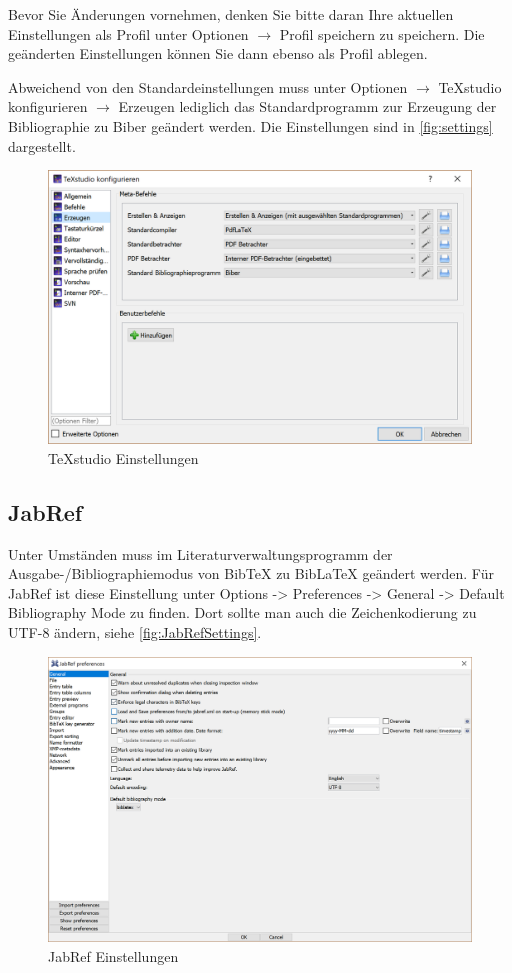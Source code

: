 \documentclass[final, english, ngerman, a4paper, 10pt, %
numbers=noenddot,
cd=true,
cdfont=false,cdfont=nohead,cdfont=nodin,
cdmath=false,
cdhead=false,
cdfoot=true,
cdcover=monochrome,
cdgeometry=symmetric,
declaration=heading,
declaration=notoc,
abstract=heading,
]{tudscrartcl}
\newcommand{\pfad}[1]{{\ttfamily\glqq #1\grqq}}
\begin{document}
Bevor Sie Änderungen vornehmen, denken Sie bitte daran Ihre aktuellen Einstellungen als Profil unter \pfad{Optionen $\rightarrow$ Profil speichern} zu speichern. Die geänderten Einstellungen können Sie dann ebenso als Profil ablegen.

Abweichend von den Standardeinstellungen muss unter \pfad{Optionen $\rightarrow$ TeXstudio konfigurieren $\rightarrow$ Erzeugen} lediglich das Standardprogramm zur Erzeugung der Bibliographie zu Biber geändert werden. Die Einstellungen sind in \autoref{fig:settings} dargestellt.
\begin{figure}[p]
	\includegraphics[width=\textwidth]{./TexStudioSettings}
	\caption{TeXstudio Einstellungen}\label{fig:settings}
\end{figure}

\subsection*{JabRef}

Unter Umständen muss im Literaturverwaltungsprogramm der Ausgabe-/Bibliographiemodus von BibTeX zu BibLaTeX geändert werden. Für JabRef ist diese Einstellung unter \pfad{Options -> Preferences -> General -> Default Bibliography Mode} zu finden. Dort sollte man auch die Zeichenkodierung zu UTF-8 ändern, siehe \autoref{fig:JabRefSettings}.
\begin{figure}[p]
	\includegraphics[width=\textwidth]{./JabRefSettings}
	\caption{JabRef Einstellungen}\label{fig:JabRefSettings}
\end{figure}
\end{document}
